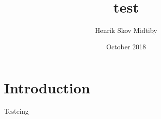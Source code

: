 \documentclass{article}
\title{test}
\author{Henrik Skov Midtiby}
\date{October 2018}
\begin{document}
\maketitle

\section{Introduction}


Testeing 
\end{document}
